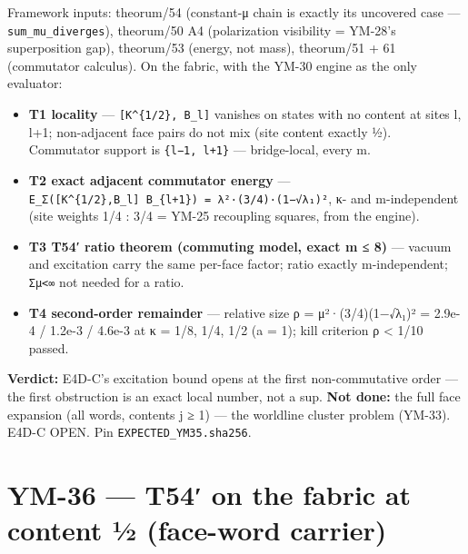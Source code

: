 Framework inputs: theorum/54 (constant-μ chain is exactly its uncovered case --- \texttt{sum\_mu\_diverges}), theorum/50 A4 (polarization visibility = YM-28's superposition gap), theorum/53 (energy, not mass), theorum/51 + 61 (commutator calculus). On the fabric, with the YM-30 engine as the only evaluator:

\begin{itemize}
\tightlist
\item
  \textbf{T1 locality} --- \texttt{{[}K\^{}\{1/2\},\ B\_l{]}} vanishes on states with no content at sites l, l+1; non-adjacent face pairs do not mix (site content exactly ½). Commutator support is \texttt{\{l−1,\ l+1\}} --- bridge-local, every m.
\item
  \textbf{T2 exact adjacent commutator energy} --- \texttt{E\_Σ({[}K\^{}\{1/2\},B\_l{]}\ B\_\{l+1\})\ =\ λ²·(3/4)·(1−√λ₁)²}, κ- and m-independent (site weights 1/4 : 3/4 = YM-25 recoupling squares, from the engine).
\item
  \textbf{T3 T54′ ratio theorem (commuting model, exact m ≤ 8)} --- vacuum and excitation carry the same per-face factor; ratio exactly m-independent; \texttt{Σμ\textless{}∞} not needed for a ratio.
\item
  \textbf{T4 second-order remainder} --- relative size ρ = μ²·(3/4)(1−√λ₁)² = 2.9e-4 / 1.2e-3 / 4.6e-3 at κ = 1/8, 1/4, 1/2 (a = 1); kill criterion ρ \textless{} 1/10 passed.
\end{itemize}

\textbf{Verdict:} E4D-C's excitation bound opens at the first non-commutative order --- the first obstruction is an exact local number, not a sup. \textbf{Not done:} the full face expansion (all words, contents j ≥ 1) --- the worldline cluster problem (YM-33). E4D-C OPEN. Pin \texttt{EXPECTED\_YM35.sha256}.

\hypertarget{ym-36-t54-on-the-fabric-at-content-uxbd-face-word-carrier}{%
\section{YM-36 --- T54′ on the fabric at content ½ (face-word carrier)}\label{ym-36-t54-on-the-fabric-at-content-uxbd-face-word-carrier}}

